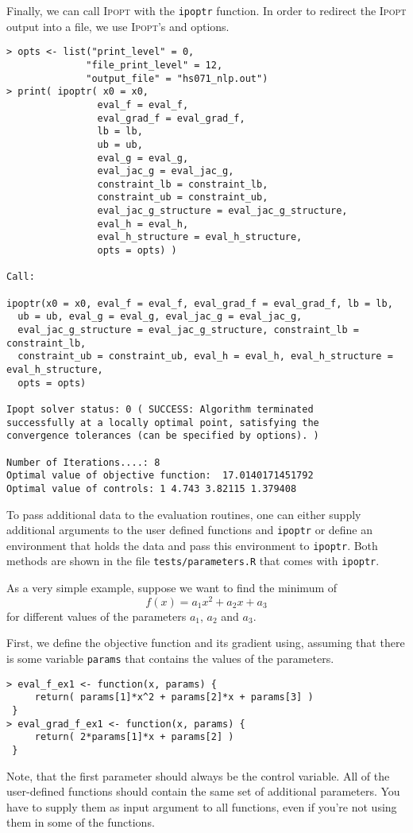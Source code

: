 \documentclass[10pt]{article}
\newcommand{\Ipopt}{\textsc{Ipopt}\xspace}
\newcommand{\ipoptr}{\texttt{ipoptr}\xspace}
\begin{document}
Finally, we can call \Ipopt with the {\tt ipoptr} function.
In order to redirect the \Ipopt output into a file, we use \Ipopt's
 and
 options.
\begin{verbatim}
> opts <- list("print_level" = 0,
              "file_print_level" = 12,
              "output_file" = "hs071_nlp.out")
> print( ipoptr( x0 = x0, 
                eval_f = eval_f, 
                eval_grad_f = eval_grad_f, 
                lb = lb, 
                ub = ub, 
                eval_g = eval_g, 
                eval_jac_g = eval_jac_g, 
                constraint_lb = constraint_lb, 
                constraint_ub = constraint_ub, 
                eval_jac_g_structure = eval_jac_g_structure,
                eval_h = eval_h,
                eval_h_structure = eval_h_structure,
                opts = opts) )

Call:

ipoptr(x0 = x0, eval_f = eval_f, eval_grad_f = eval_grad_f, lb = lb, 
  ub = ub, eval_g = eval_g, eval_jac_g = eval_jac_g,
  eval_jac_g_structure = eval_jac_g_structure, constraint_lb = constraint_lb,
  constraint_ub = constraint_ub, eval_h = eval_h, eval_h_structure = eval_h_structure,
  opts = opts)

Ipopt solver status: 0 ( SUCCESS: Algorithm terminated 
successfully at a locally optimal point, satisfying the 
convergence tolerances (can be specified by options). )

Number of Iterations....: 8 
Optimal value of objective function:  17.0140171451792 
Optimal value of controls: 1 4.743 3.82115 1.379408
\end{verbatim}

To pass additional data to the evaluation routines, one can either supply 
additional arguments to the user defined functions and {\tt ipoptr} or define 
an environment that holds the data and pass this environment to {\tt ipoptr}.
Both methods are shown in the file \texttt{tests/parameters.R} that comes with 
\ipoptr.

As a very simple example, suppose we want to find the minimum of
\[
f( x ) = a_1 x^2 + a_2 x + a_3
\]
for different values of the parameters $a_1$, $a_2$ and $a_3$. 

First, we define the objective function and its gradient using, assuming that 
there is some variable \texttt{params} that contains the values of the 
parameters.
\begin{verbatim}
> eval_f_ex1 <- function(x, params) { 
     return( params[1]*x^2 + params[2]*x + params[3] ) 
 }
> eval_grad_f_ex1 <- function(x, params) { 
     return( 2*params[1]*x + params[2] ) 
 }
\end{verbatim}
Note, that the first parameter should always be the control variable. All of 
the user-defined functions should contain the same set of additional 
parameters. You have to supply them as input argument to all functions, even 
if you're not using them in some of the functions. 
\end{document}
